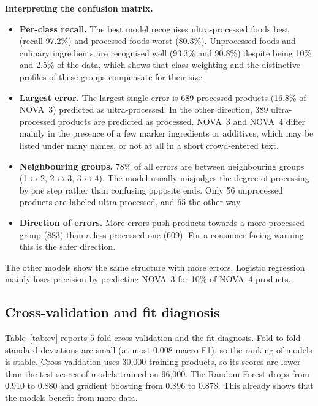 \documentclass[conference]{IEEEtran}
\begin{document}
\textbf{Interpreting the confusion matrix.}
\begin{itemize}
    \item \textbf{Per-class recall.} The best model recognises ultra-processed foods best (recall 97.2\%) and processed foods worst (80.3\%). Unprocessed foods and culinary ingredients are recognised well (93.3\% and 90.8\%) despite being 10\% and 2.5\% of the data, which shows that class weighting and the distinctive profiles of these groups compensate for their size.
    \item \textbf{Largest error.} The largest single error is 689 processed products (16.8\% of NOVA~3) predicted as ultra-processed. In the other direction, 389 ultra-processed products are predicted as processed. NOVA~3 and NOVA~4 differ mainly in the presence of a few marker ingredients or additives, which may be listed under many names, or not at all in a short crowd-entered text.
    \item \textbf{Neighbouring groups.} 78\% of all errors are between neighbouring groups (1$\leftrightarrow$2, 2$\leftrightarrow$3, 3$\leftrightarrow$4). The model usually misjudges the degree of processing by one step rather than confusing opposite ends. Only 56 unprocessed products are labeled ultra-processed, and 65 the other way.
    \item \textbf{Direction of errors.} More errors push products towards a more processed group (883) than a less processed one (609). For a consumer-facing warning this is the safer direction.
\end{itemize}
The other models show the same structure with more errors. Logistic regression mainly loses precision by predicting NOVA~3 for 10\% of NOVA~4 products.

\subsection{Cross-validation and fit diagnosis}
Table~\ref{tab:cv} reports 5-fold cross-validation and the fit diagnosis. Fold-to-fold standard deviations are small (at most 0.008 macro-F1), so the ranking of models is stable. Cross-validation uses 30,000 training products, so its scores are lower than the test scores of models trained on 96,000. The Random Forest drops from 0.910 to 0.880 and gradient boosting from 0.896 to 0.878. This already shows that the models benefit from more data.
\end{document}
